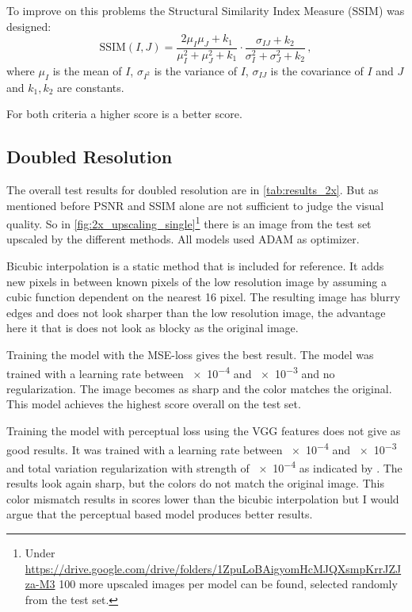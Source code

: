 \documentclass{scrartcl}
\begin{document}
To improve on this problems the Structural Similarity Index Measure (SSIM) was designed:
\[
	\mathrm{SSIM}(I, J)
	= \frac{2\mu_I\mu_J + k_1}{\mu_I^2+\mu_J^2+k_1} \cdot \frac{\sigma_{IJ} + k_2}{\sigma_I^2 + \sigma_J^2 + k_2}
	\,,
\]
where \( \mu_I \) is the mean of \( I \), \( \sigma_{I^2} \) is the variance of \( I \), \( \sigma_{IJ} \) is the covariance of \( I \) and \( J \) and \( k_1, k_2 \) are constants.

For both criteria a higher score is a better score.

\subsection{Doubled Resolution}

The overall test results for doubled resolution are in \cref{tab:results_2x}.
But as mentioned before PSNR and SSIM alone are not sufficient to judge the visual quality.
So in \cref{fig:2x_upscaling_single}\footnote{Under \url{https://drive.google.com/drive/folders/1ZpuLoBAigyomHcMJQXsmpKrrJZJza-M3} 100 more upscaled images per model can be found, selected randomly from the test set.} there is an image from the test set upscaled by the different methods.
All models used ADAM as optimizer.

Bicubic interpolation is a static method that is included for reference.
It adds new pixels in between known pixels of the low resolution image by assuming a cubic function dependent on the nearest \num{16} pixel.
The resulting image has blurry edges and does not look sharper than the low resolution image, the advantage here it that is does not look as blocky as the original image.

Training the model with the MSE-loss gives the best result.
The model was trained with a learning rate between \num{e-4} and \num{e-3} and no regularization.
The image becomes as sharp and the color matches the original. 
This model achieves the highest score overall on the test set.

Training the model with perceptual loss using the VGG features does not give as good results.
It was trained with a learning rate between \num{e-4} and \num{e-3} and total variation regularization with strength of \num{e-4} as indicated by \textcite{perceptual_loss}.
The results look again sharp, but the colors do not match the original image.
This color mismatch results in scores lower than the bicubic interpolation but I would argue that the perceptual based model produces better results.
\end{document}
